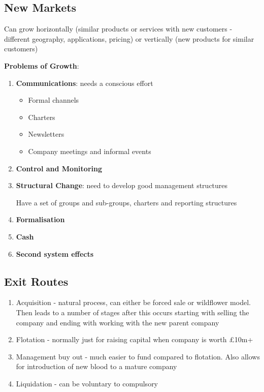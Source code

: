\documentclass{article}
\newenvironment{pros}{\par\color[rgb]{0.066, 0.4, 0.129}}{\par}
\newenvironment{cons}{\par\color{red}}{\par}
\begin{document}
\begin{multicols}{2}
\subsection{New Markets}
Can grow horizontally (similar products or services with new customers - different geography, applications, pricing) or vertically (new products for similar customers)\\
\begin{cons}
\textbf{Problems of Growth}:
\begin{enumerate}
    \item \textbf{Communications}: needs a conscious effort
    \begin{pros}
    \begin{itemize}
        \item Formal channels
        \item Charters
        \item Newsletters
        \item Company meetings and informal events
    \end{itemize}
    \end{pros}
    \item \textbf{Control and Monitoring}
    \item \textbf{Structural Change}: need to develop good management structures
    \begin{pros}
    Have a set of groups and sub-groups, charters and reporting structures
    \end{pros}
    \item \textbf{Formalisation}
    \item \textbf{Cash}
    \item \textbf{Second system effects}
\end{enumerate}
\end{cons}

\subsection{Exit Routes}
\begin{enumerate}
    \item Acquisition - natural process, can either be forced sale or wildflower model. Then leads to a number of stages after this occurs starting with selling the company and ending with working with the new parent company
    \item Flotation - normally just for raising capital when company is worth £10m+
    \item Management buy out - much easier to fund compared to flotation. Also allows for introduction of new blood to a mature company
    \item Liquidation - can be voluntary to compulsory
\end{enumerate}


\end{multicols}
\end{document}
